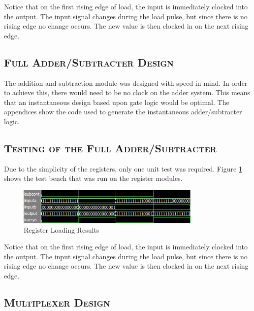 \documentclass[11pt]{report}
\begin{document}
\begin{spacing}{1.5}
Notice that on the first rising edge of load, the input is immediately clocked into the output.  The input signal changes during the load pulse, but since there is no rising edge no change occurs.  The new value is then clocked in on the next rising edge.

\setcounter{section}{2}
\setcounter{subsection}{0}
\subsection{\scshape Full Adder/Subtracter Design}
\label{sub:design_piso}

The addition and subtraction module was designed with speed in mind.  In order to achieve this, there would need to be no clock on the adder system.  This means that an instantaneous design based upon gate logic would be optimal.  The appendices show the code used to generate the instantaneous adder/subtracter logic.

\subsection{\scshape Testing of the Full Adder/Subtracter}
\label{sub:test_piso}

Due to the simplicity of the registers, only one unit test was required.  Figure \ref{fig:register} shows the test bench that was run on the register modules.

\vspace{15px}
\begin{figure}[H]
    \centering
    \includegraphics[width=0.8\textwidth,keepaspectratio]{addsubtest.png}
    \caption{Register Loading Results}
    \label{fig:register}
\end{figure}

Notice that on the first rising edge of load, the input is immediately clocked into the output.  The input signal changes during the load pulse, but since there is no rising edge no change occurs.  The new value is then clocked in on the next rising edge.

\setcounter{section}{3}
\setcounter{subsection}{0}
\subsection{\scshape Multiplexer Design}
\label{sub:design_piso}


\end{spacing}
\end{document}
